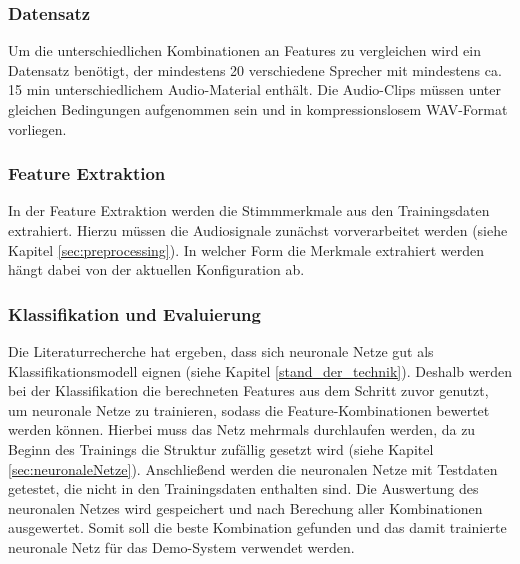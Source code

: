 


\subsubsection{Datensatz} \label{sec:KonzeptDatensatz}

Um die unterschiedlichen Kombinationen an Features zu vergleichen wird ein Datensatz benötigt, der mindestens 20 verschiedene Sprecher mit mindestens ca. 15 min unterschiedlichem Audio-Material enthält.
Die Audio-Clips müssen unter gleichen Bedingungen aufgenommen sein und in kompressionslosem WAV-Format vorliegen.

\subsubsection{Feature Extraktion}

In der Feature Extraktion werden die Stimmmerkmale aus den Trainingsdaten extrahiert.
Hierzu müssen die Audiosignale zunächst vorverarbeitet werden (siehe Kapitel \ref{sec:preprocessing}).
In welcher Form die Merkmale extrahiert werden hängt dabei von der aktuellen Konfiguration ab.

\subsubsection{Klassifikation und Evaluierung}\label{sec:KonzeptKlassifikation}

Die Literaturrecherche hat ergeben, dass sich neuronale Netze gut als Klassifikationsmodell eignen (siehe Kapitel \ref{stand_der_technik}). 
Deshalb werden bei der Klassifikation die berechneten Features aus dem Schritt zuvor genutzt, um neuronale Netze zu trainieren, sodass die Feature-Kombinationen bewertet werden können.
Hierbei muss das Netz mehrmals durchlaufen werden, da zu Beginn des Trainings die Struktur zufällig gesetzt wird (siehe Kapitel \ref{sec:neuronaleNetze}).
Anschließend werden die neuronalen Netze mit Testdaten getestet, die nicht in den Trainingsdaten enthalten sind.
Die Auswertung des neuronalen Netzes wird gespeichert und nach Berechung aller Kombinationen ausgewertet.
Somit soll die beste Kombination gefunden und das damit trainierte neuronale Netz für das Demo-System verwendet werden.

